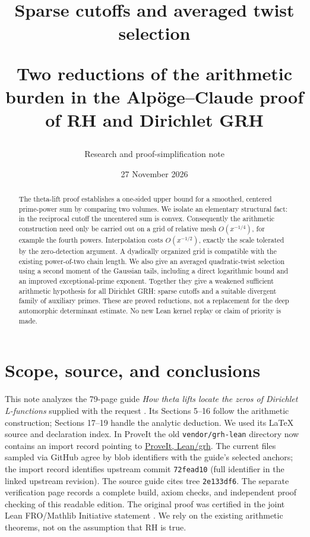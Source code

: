 \documentclass[11pt,a4paper]{article}
\title{\vspace{-1.4cm}\textbf{Sparse cutoffs and averaged twist selection}\par\large Two reductions of the arithmetic burden in the Alp\"oge--Claude proof of RH and Dirichlet GRH}
\author{Research and proof-simplification note}
\date{27 November 2026}
\theoremstyle{remark}\newtheorem{remark}[theorem]{Remark}
\newcommand{\repo}{\href{https://github.com/VladimirReshetnikov/ProveIt/tree/main/Analysis/GeneralizedRiemannHypothesis/Lean/grh}{ProveIt, Lean/grh}}
\begin{document}
\maketitle
\begin{abstract}
The theta-lift proof establishes a one-sided upper bound for a smoothed, centered prime-power sum by comparing two volumes. We isolate an elementary structural fact: in the reciprocal cutoff the uncentered sum is convex. Consequently the arithmetic construction need only be carried out on a grid of relative mesh $O(x^{-1/4})$, for example the fourth powers. Interpolation costs $O(x^{-1/2})$, exactly the scale tolerated by the zero-detection argument. A dyadically organized grid is compatible with the existing power-of-two chain length. We also give an averaged quadratic-twist selection using a second moment of the Gaussian tails, including a direct logarithmic bound and an improved exceptional-prime exponent. Together they give a weakened sufficient arithmetic hypothesis for all Dirichlet GRH: sparse cutoffs and a suitable divergent family of auxiliary primes. These are proved reductions, not a replacement for the deep automorphic determinant estimate. No new Lean kernel replay or claim of priority is made.
\end{abstract}
\tableofcontents
\section{Scope, source, and conclusions}
This note analyzes the 79-page guide \emph{How theta lifts locate the zeros of Dirichlet L-functions} supplied with the request \cite{guide}. Its Sections 5--16 follow the arithmetic construction; Sections 17--19 handle the analytic deduction. We used its LaTeX source and declaration index. In ProveIt the old \texttt{vendor/grh-lean} directory now contains an import record pointing to \repo. The current files sampled via GitHub agree by blob identifiers with the guide's selected anchors; the import record identifies upstream commit \texttt{72fead10} (full identifier in the linked upstream revision). The source guide cites tree \texttt{2e133df6}. The separate verification page \cite{sutherland} records a complete build, axiom checks, and independent proof checking of this readable edition. The original proof was certified in the joint Lean FRO/Mathlib Initiative statement \cite{joint}. We rely on the existing arithmetic theorems, not on the assumption that RH is true.
\end{document}
